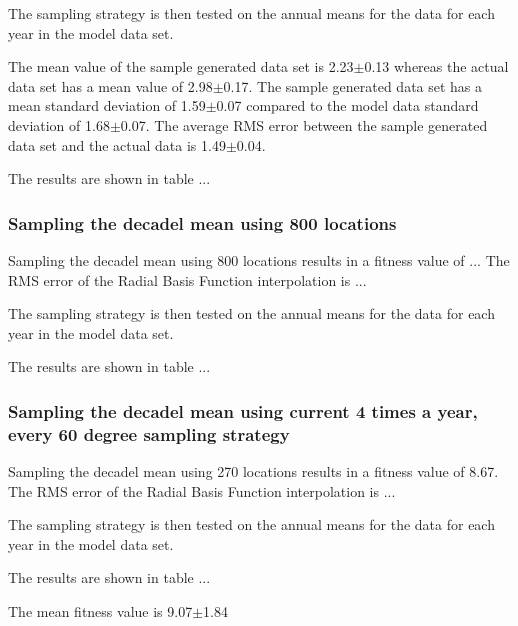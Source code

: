 \documentclass[11pt, a4paper]{article}
\numberwithin{figure}{section}
\numberwithin{table}{section}
\begin{document}
The sampling strategy is then tested on the annual means for the data
for each year in the model data set.

The mean value of the sample generated data set is
2.23$\pm$0.13 whereas the actual data set has a mean value of
2.98$\pm$0.17.
The sample generated data set has a mean standard deviation of 
1.59$\pm$0.07 compared to the model data standard deviation of 
1.68$\pm$0.07.
The average RMS error between the sample generated data set and the 
actual data is 1.49$\pm$0.04.

The results are shown in table ...



\subsubsection{Sampling the decadel mean using 800 locations}
Sampling the decadel mean using 800 locations results in a fitness
value of ...
The RMS error of the Radial Basis Function interpolation is ...

The sampling strategy is then tested on the annual means for the data
for each year in the model data set.

The results are shown in table ...

%

\subsubsection{Sampling the decadel mean using current 4 times a year, every 60 degree sampling strategy}
Sampling the decadel mean using 270 locations results in a fitness
value of 8.67.
The RMS error of the Radial Basis Function interpolation is ...

The sampling strategy is then tested on the annual means for the data
for each year in the model data set.

The results are shown in table ...

The mean fitness value is 9.07$\pm$1.84


\end{document}
